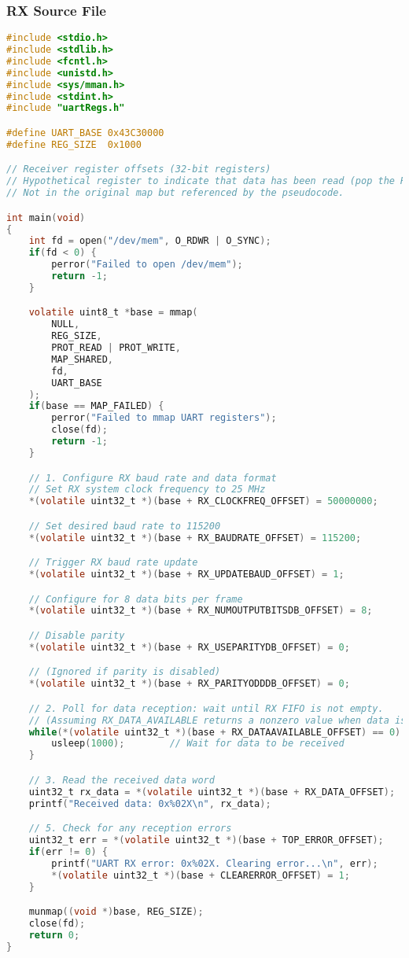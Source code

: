 \subsubsection{RX Source File}
\begin{lstlisting}[language=C,frame=single,label={lst:rx-source}]
#include <stdio.h>
#include <stdlib.h>
#include <fcntl.h>
#include <unistd.h>
#include <sys/mman.h>
#include <stdint.h>
#include "uartRegs.h"

#define UART_BASE 0x43C30000
#define REG_SIZE  0x1000

// Receiver register offsets (32-bit registers)
// Hypothetical register to indicate that data has been read (pop the RX FIFO)
// Not in the original map but referenced by the pseudocode.

int main(void)
{
    int fd = open("/dev/mem", O_RDWR | O_SYNC);
    if(fd < 0) {
        perror("Failed to open /dev/mem");
        return -1;
    }

    volatile uint8_t *base = mmap(
        NULL,
        REG_SIZE,
        PROT_READ | PROT_WRITE,
        MAP_SHARED,
        fd,
        UART_BASE
    );
    if(base == MAP_FAILED) {
        perror("Failed to mmap UART registers");
        close(fd);
        return -1;
    }

    // 1. Configure RX baud rate and data format
    // Set RX system clock frequency to 25 MHz
    *(volatile uint32_t *)(base + RX_CLOCKFREQ_OFFSET) = 50000000;

    // Set desired baud rate to 115200
    *(volatile uint32_t *)(base + RX_BAUDRATE_OFFSET) = 115200;

    // Trigger RX baud rate update
    *(volatile uint32_t *)(base + RX_UPDATEBAUD_OFFSET) = 1;

    // Configure for 8 data bits per frame
    *(volatile uint32_t *)(base + RX_NUMOUTPUTBITSDB_OFFSET) = 8;

    // Disable parity
    *(volatile uint32_t *)(base + RX_USEPARITYDB_OFFSET) = 0;

    // (Ignored if parity is disabled)
    *(volatile uint32_t *)(base + RX_PARITYODDDB_OFFSET) = 0;

    // 2. Poll for data reception: wait until RX FIFO is not empty.
    // (Assuming RX_DATA_AVAILABLE returns a nonzero value when data is available.)
    while(*(volatile uint32_t *)(base + RX_DATAAVAILABLE_OFFSET) == 0) {
        usleep(1000);        // Wait for data to be received
    }

    // 3. Read the received data word
    uint32_t rx_data = *(volatile uint32_t *)(base + RX_DATA_OFFSET);
    printf("Received data: 0x%02X\n", rx_data);

    // 5. Check for any reception errors
    uint32_t err = *(volatile uint32_t *)(base + TOP_ERROR_OFFSET);
    if(err != 0) {
        printf("UART RX error: 0x%02X. Clearing error...\n", err);
        *(volatile uint32_t *)(base + CLEARERROR_OFFSET) = 1;
    }

    munmap((void *)base, REG_SIZE);
    close(fd);
    return 0;
}
\end{lstlisting}



